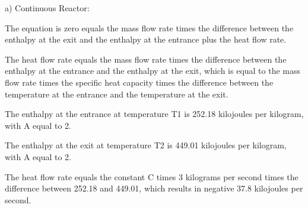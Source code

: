 a) Continuous Reactor:

The equation is zero equals the mass flow rate times the difference between the enthalpy at the exit and the enthalpy at the entrance plus the heat flow rate.

The heat flow rate equals the mass flow rate times the difference between the enthalpy at the entrance and the enthalpy at the exit, which is equal to the mass flow rate times the specific heat capacity times the difference between the temperature at the entrance and the temperature at the exit.

The enthalpy at the entrance at temperature T1 is 252.18 kilojoules per kilogram, with A equal to 2.

The enthalpy at the exit at temperature T2 is 449.01 kilojoules per kilogram, with A equal to 2.

The heat flow rate equals the constant C times 3 kilograms per second times the difference between 252.18 and 449.01, which results in negative 37.8 kilojoules per second.